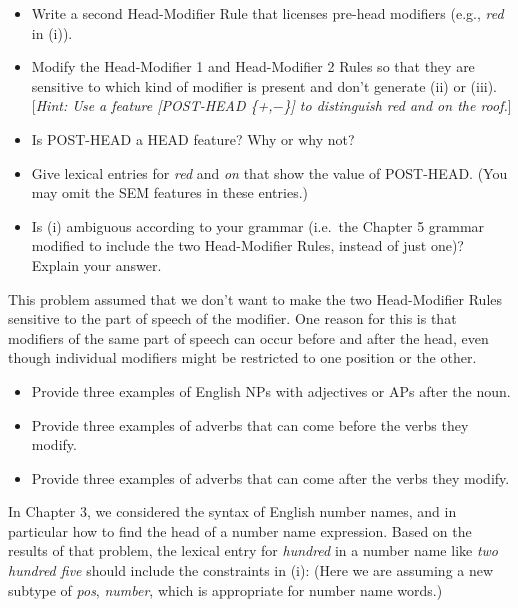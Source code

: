 \documentclass[a4paper,landscape,headrule,footrule]{foils}
\begin{document}
\newpage 
\begin{itemize}
\item[A.] Write a second Head-Modifier Rule that licenses
pre-head modifiers
(e.g., {\it red} in (i)).
\item[B.] Modify the Head-Modifier 1 and Head-Modifier 2 Rules so that
they are sensitive to which kind of modifier is present and don't
generate (ii) or (iii).  [\textsl{Hint: Use a feature
{\rm [}POST-HEAD \{+,$-$\}{\rm ]} to distinguish {\it red} and {\it on the roof}.}]
\item[C.] Is POST-HEAD a HEAD feature? Why or why not? 
\item[D.] Give lexical entries for {\it red} and {\it on} that show
the value of POST-HEAD. (You may omit the SEM features in these entries.)
\item[E.] Is (i) ambiguous according to your grammar (i.e.\ 
the Chapter 5 grammar modified to include the two Head-Modifier Rules,
instead of just one)? Explain your answer.  
\end{itemize}

This problem assumed that we don't want to make the two Head-Modifier
Rules sensitive to the part of speech of the modifier.  One reason for
this is that modifiers of the same part of speech can occur before and
after the head, even though individual modifiers might be restricted
to one position or the other.

\begin{itemize}
\item[F.] Provide three examples of English NPs with
adjectives or APs after the noun. 
\item[G.] Provide three examples of adverbs that can come before 
the verbs they modify.
\item[H.] Provide three examples of adverbs that can come after
the verbs they modify.
\end{itemize}


In  Chapter 3, we considered the
syntax of English number names, and in particular how
to find the head of a number name expression. Based on the
results of that problem, the lexical entry for
{\it hundred} in a number name like {\it two hundred five}
should include the constraints in (i): (Here we are assuming
a new subtype of {\it pos}, {\it number}, which is appropriate
for number name words.)
\end{document}
